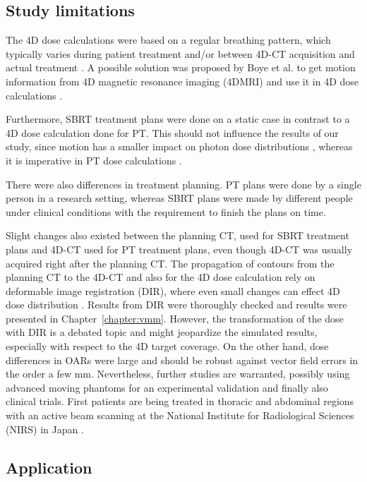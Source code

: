 \subsection{Study limitations}


The 4D dose calculations were based on a regular breathing pattern, which typically varies during patient treatment and/or between 4D-CT acquisition and actual treatment \cite{Verma2010, Malinowski2011}. 
A possible solution was proposed by Boye et al. to get motion information from 4D magnetic resonance imaging (4DMRI) and use it in 4D dose calculations \cite{Boye2013}.

Furthermore, SBRT treatment plans were done on a static case in contrast to a 4D dose calculation done for PT. This should not influence the results of our study, 
since motion has a smaller impact on photon dose distributions \cite{Zou2014}, whereas it is imperative in PT dose calculations \cite{Bert2011}. 

There were also differences in treatment planning. PT plans were done by a single person in a research setting, whereas SBRT plans were made by different people under clinical conditions with the requirement to finish the plans on time. 

Slight changes also existed between the planning CT, used for SBRT treatment plans and 4D-CT used for PT treatment plans, even though 4D-CT was usually acquired right after the planning CT. 
The propagation of contours from the planning CT to the 4D-CT and also for the 4D dose calculation rely on deformable image registration (DIR), where even small changes can effect 4D dose distribution \cite{Kashani2008}. 
Results from DIR were thoroughly checked and results were presented in Chapter~\ref{chapter:vmm}. However, the transformation of the dose with DIR is a debated topic and might jeopardize the simulated results, especially with respect to the 4D target coverage. On the other hand, dose differences 
in OARs were large and should be robust against vector field errors in the order a few mm. Nevertheless, further studies are warranted, possibly using advanced moving phantoms for an experimental 
validation \cite{Perrin2014} and finally also clinical trials. First patients are being treated in thoracic and abdominal regions with an active beam scanning at the National Institute for Radiological Sciences (NIRS) in Japan \cite{Mori2016}.



\subsection{Application}

